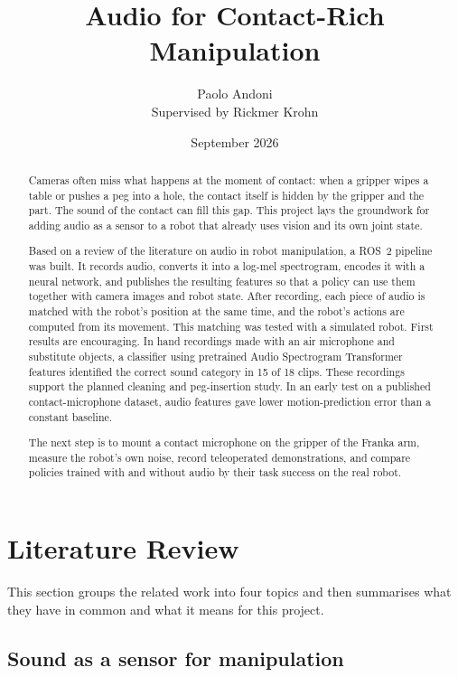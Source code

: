 \documentclass[
  english,
  accentcolor=11b,
  type=intern,
  marginpar=false,
  logofile=figures/PEARLTUDA.png
]{tudapub}
\title{Audio for Contact-Rich Manipulation}
\author{Paolo Andoni\\Supervised by Rickmer Krohn}
\date{September 2026}
\begin{document}
\maketitle

\begin{abstract}
Cameras often miss what happens at the moment of contact: when a gripper wipes a table or pushes a peg into a hole, the contact itself is hidden by the gripper and the part. The sound of the contact can fill this gap. This project lays the groundwork for adding audio as a sensor to a robot that already uses vision and its own joint state.

Based on a review of the literature on audio in robot manipulation, a ROS~2 pipeline was built. It records audio, converts it into a log-mel spectrogram, encodes it with a neural network, and publishes the resulting features so that a policy can use them together with camera images and robot state. After recording, each piece of audio is matched with the robot's position at the same time, and the robot's actions are computed from its movement. This matching was tested with a simulated robot. First results are encouraging. In hand recordings made with an air microphone and substitute objects, a classifier using pretrained Audio Spectrogram Transformer features identified the correct sound category in 15 of 18 clips. These recordings support the planned cleaning and peg-insertion study. In an early test on a published contact-microphone dataset, audio features gave lower motion-prediction error than a constant baseline.

The next step is to mount a contact microphone on the gripper of the Franka arm, measure the robot's own noise, record teleoperated demonstrations, and compare policies trained with and without audio by their task success on the real robot.
\end{abstract}

\tableofcontents

\section{Literature Review}
\label{sec:lit}

This section groups the related work into four topics and then summarises what they have in common and what it means for this project.

\subsection{Sound as a sensor for manipulation}
\end{document}
